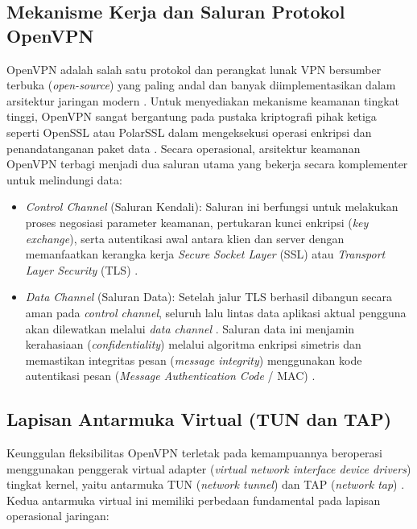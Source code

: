 \subsection{Mekanisme Kerja dan Saluran Protokol OpenVPN}
OpenVPN adalah salah satu protokol dan perangkat lunak VPN bersumber terbuka (\textit{open-source}) yang paling andal dan banyak diimplementasikan dalam arsitektur jaringan modern \citep{crist2015mastering}. Untuk menyediakan mekanisme keamanan tingkat tinggi, OpenVPN sangat bergantung pada pustaka kriptografi pihak ketiga seperti OpenSSL atau PolarSSL dalam mengeksekusi operasi enkripsi dan penandatanganan paket data \citep{crist2015mastering}. Secara operasional, arsitektur keamanan OpenVPN terbagi menjadi dua saluran utama yang bekerja secara komplementer untuk melindungi data:

\begin{itemize}
    \item \textit{Control Channel} (Saluran Kendali): Saluran ini berfungsi untuk melakukan proses negosiasi parameter keamanan, pertukaran kunci enkripsi (\textit{key exchange}), serta autentikasi awal antara klien dan server dengan memanfaatkan kerangka kerja \textit{Secure Socket Layer} (SSL) atau \textit{Transport Layer Security} (TLS) \citep{crist2015mastering, stallings2006cryptography}.
    \item \textit{Data Channel} (Saluran Data): Setelah jalur TLS berhasil dibangun secara aman pada \textit{control channel}, seluruh lalu lintas data aplikasi aktual pengguna akan dilewatkan melalui \textit{data channel} \citep{crist2015mastering}. Saluran data ini menjamin kerahasiaan (\textit{confidentiality}) melalui algoritma enkripsi simetris dan memastikan integritas pesan (\textit{message integrity}) menggunakan kode autentikasi pesan (\textit{Message Authentication Code} / MAC) \citep{stallings2006cryptography}.
\end{itemize}

\subsection{Lapisan Antarmuka Virtual (TUN dan TAP)}
\label{subsec:bab2-tun-tap}

Keunggulan fleksibilitas OpenVPN terletak pada kemampuannya beroperasi menggunakan penggerak virtual adapter (\textit{virtual network interface device drivers}) tingkat kernel, yaitu antarmuka TUN (\textit{network tunnel}) dan TAP (\textit{network tap}) \citep{crist2015mastering}. Kedua antarmuka virtual ini memiliki perbedaan fundamental pada lapisan operasional jaringan:

